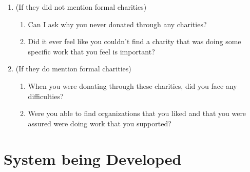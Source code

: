 \documentclass[11pt]{article}
\begin{document}
    \begin{enumerate}
    
        \item (If they did not mention formal charities)
        
        \begin{enumerate}[label=(\alph*)]
            \item Can I ask why you never donated through any charities?
            \item Did it ever feel like you couldn’t find a charity that was doing some specific work that you feel is important?
        \end{enumerate}
        
        \item (If they do mention formal charities)
        
        \begin{enumerate}[label=(\alph*)]
            \item When you were donating through these charities, did you face any difficulties?
            \item Were you able to find organizations that you liked and that you were assured were doing work that you supported?
        \end{enumerate}
    
    \end{enumerate}
    
    \section {System being Developed}
    
\end{document}
